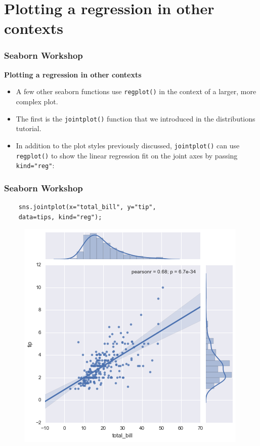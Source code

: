 \documentclass{beamer}
\begin{document}
\section{Plotting a regression in other contexts}
\begin{frame}[fragile]
	\frametitle{Seaborn Workshop}
	\large
	\noindent \textbf{Plotting a regression in other contexts}
	\begin{itemize}
		\item A few other seaborn functions use \texttt{regplot()} in the context of a larger, more complex plot. 
		\item The first is the \texttt{jointplot()} function that we introduced in the distributions tutorial.
		\item In addition to the plot styles previously discussed, \texttt{jointplot()} can use \texttt{regplot()} to show the linear regression fit on the joint axes by passing \texttt{kind="reg"}:
	\end{itemize}
\end{frame}
\begin{frame}[fragile]
	\frametitle{Seaborn Workshop}
	\large
	
	\begin{verbatim}
	sns.jointplot(x="total_bill", y="tip", 
	data=tips, kind="reg");
	\end{verbatim}
	
	\begin{figure}
		\centering
		\includegraphics[width=0.60\linewidth]{images/regression_51_0}
	\end{figure}
\end{frame}
\end{document}

